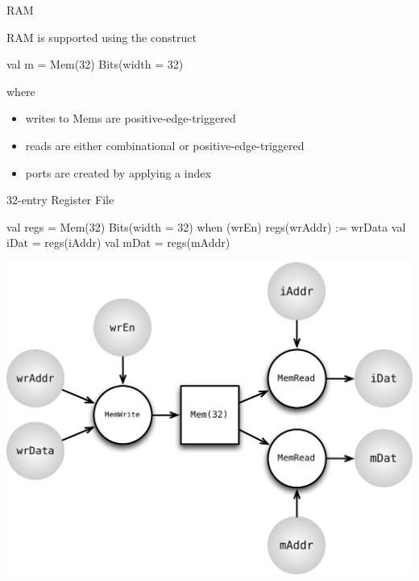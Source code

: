 \documentclass[xcolor=pdflatex,dvipsnames,table]{beamer}
\begin{document}
\begin{frame}[fragile]{RAM}

RAM is supported using the  construct

\begin{scala}
val m = Mem(32){ Bits(width = 32) }
\end{scala}

\noindent
where
\begin{itemize}
\item writes to Mems are positive-edge-triggered
\item reads are either combinational or positive-edge-triggered
\item ports are created by applying a  index
\end{itemize}
\end{frame}

\begin{frame}[fragile]{32-entry Register File}

\begin{scala}
val regs = Mem(32){ Bits(width = 32) }
when (wrEn) {
  regs(wrAddr) := wrData
}
val iDat = regs(iAddr)
val mDat = regs(mAddr)
\end{scala}

\begin{center}
\includegraphics[height=0.55\textheight]{figs/mem.pdf} 
\end{center}

\end{frame}
\end{document}
